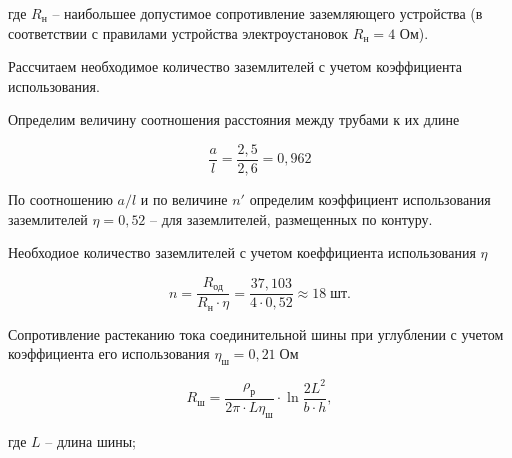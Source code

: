         где $R_\text{н}$ -- наибольшее допустимое сопротивление
        заземляющего устройства (в соответствии с правилами устройства
        электроустановок $R_\text{н} = 4$ Ом). 

        Рассчитаем необходимое количество заземлителей с учетом коэффициента
        использования.

        Определим величину соотношения расстояния между трубами к их длине

        \begin{equation*}
                \frac{a}{l} = \frac{2,5}{2,6} = 0,962
        \end{equation*}

        По соотношению $a/l$  и по величине $n'$ определим
        коэффициент использования заземлителей $\eta = 0,52$  -- для
        заземлителей, размещенных по контуру.

        Необходиое количество заземлителей с учетом коеффициента использования
        $\eta$

        \begin{equation*}
                n = \frac{R_\text{од}}{R_\text{н} \cdot \eta} =
                    \frac{37,103}{4 \cdot 0,52} \approx 18 \; \text{шт}.
        \end{equation*}

        Сопротивление растеканию тока соединительной шины при углублении с
        учетом коэффициента его использования $\eta_\text{ш} = 0,21 \;
        \text{Ом}$

        \begin{equation*}
                R_\text{ш} = \frac{\rho_\text{р}}{2\pi \cdot L \eta_\text{ш}}
                    \cdot \ln \frac{2L^2}{b \cdot h},
        \end{equation*}

%
%
        где $L$ -- длина шины;

